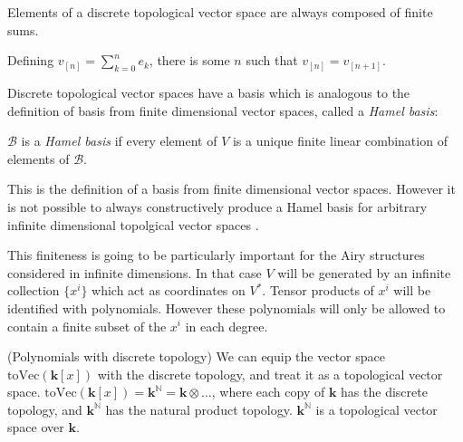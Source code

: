         \begin{rem}
        Elements of a discrete topological vector space are always composed of finite sums. 
        
        Defining \( v_{[n]}  = \sum_{k=0}^n e_k\), there is some \(n\) such that \(v_{[n]} = v_{[n+1]}\). 
        \end{rem}
        
        Discrete topological vector spaces have a basis which is analogous to the definition of basis from finite dimensional vector spaces, called a \emph{Hamel basis}:
        
        \begin{defn}
        \( \mathcal{B}\) is a \emph{Hamel basis} if every element of \(  V\) is a unique finite linear combination of elements of \( \mathcal{B}\).
        \end{defn}
        
        This is the definition of a basis from finite dimensional vector spaces. However it is not possible to always constructively produce a Hamel basis for arbitrary infinite dimensional topolgical vector spaces  \cite{basis_vect}.


        
        
        
        \begin{rem}
        This finiteness is going to be particularly important for the Airy structures considered in infinite dimensions. In that case \(V\) will be generated by an infinite collection \( \{x^i\}\) which act as coordinates on \(V^*\). Tensor products of \(x^i\) will be identified with polynomials. However these polynomials will only be allowed to contain a finite subset of the \(x^i\) in each degree.
        \end{rem}
        
        \begin{ex}(Polynomials with discrete topology) We can equip the vector space \(\mathrm{toVec}(\mathbf{k}[x])\) with the discrete topology, and treat it as a topological vector space.
        \( \mathrm{toVec}(\mathbf{k}[x]) = \mathbf{k}^{\mathbb{N}} = \mathbf{k} \otimes \dots \),
        where each copy of \( \mathbf{k}\) has the discrete topology, and \( \mathbf{k}^{\mathbb{N}}\) has the natural product topology. \(\mathbf{k}^{\mathbb{N}}\) is a topological vector space over \( \mathbf{k}\).
        \end{ex}
    
